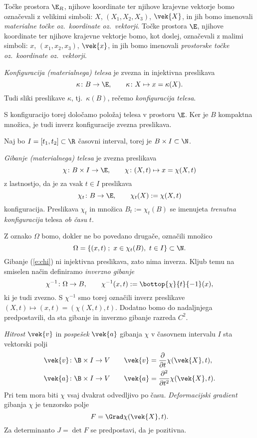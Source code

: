 Točke prostora $\E_R$, njihove koordinate ter njihove krajevne vektorje bomo označevali
z velikimi simboli: $X$, $(X_1,X_2,X_3)$, $\vek{X}$, in jih bomo imenovali
\emph{materialne točke oz.~koordinate oz.~vektorji}.
Točke prostora $\E$, njihove koordinate ter njihove krajevne vektorje bomo,
kot doslej, označevali z malimi simboli: $x$, $(x_1,x_2,x_3)$, $\vek{x}$, in jih bomo imenovali
\emph{prostorske točke oz.~koordinate oz.~vektorji}.

\begin{definicija}
	\emph{Konfiguracija (materialnega) telesa} je zvezna in injektivna preslikava
	\[ \kappa\colon B\to\E,\qquad \kappa\colon X\mapsto x=\kappa(X). \]
	Tudi sliki preslikave $\kappa$, tj.~$\kappa(B)$, rečemo \emph{konfiguracija telesa}.
\end{definicija}
S konfiguracijo torej določamo položaj telesa v prostoru $\E$. Ker je $B$ kompaktna
množica, je tudi inverz konfiguracije zvezna preslikava.

Naj bo $I=[t_1,t_2]\subset\R$ časovni interval, torej je $B\times I\subset\N$.
\begin{definicija}
	\emph{Gibanje (materialnega) telesa} je zvezna preslikava
	\begin{equation}\label{e:chi}
		\chi\colon B\times I\to\E,\qquad \chi\colon(X,t)\mapsto x=\chi(X,t)
	\end{equation}
	z lastnostjo, da je za vsak $t\in I$ preslikava
	\[ \chi_t\colon B\to\E, \qquad \chi_t(X):=\chi(X,t) \]
	konfiguracija. Preslikava $\chi_t$ in množica $ B_t:=\chi_t(B)$ se imenujeta
	\emph{trenutna konfiguracija} telesa \emph{ob času} $t$.
\end{definicija}

Z oznako $\Omega$ bomo, dokler ne bo povedano drugače, označili množico
\[ \Omega=\{(x,t)\;;\ x\in\chi_t(B),\ t\in I\}\subset\N. \]
Gibanje (\ref{e:chi}) ni injektivna preslikava, zato nima inverza. Kljub temu na smiselen
način definiramo \emph{inverzno gibanje}
\[
	\chi^{-1}\colon\Omega\to B,\qquad
	\chi^{-1}(x,t):=\bottop{\chi}{t}{-1}(x),
\]
ki je tudi zvezno. S $\chi^{-1}$ smo torej označili inverz preslikave
$(X,t)\mapsto(x,t)=(\chi(X,t),t)$. Dodatno bomo do nadaljnjega predpostavili, da sta gibanje
in inverzno gibanje razreda $C^2$.

\emph{Hitrost} $\vek{v}$ in \emph{pospešek} $\vek{a}$ gibanja $\chi$ v časovnem intervalu $I$ sta vektorski polji
\begin{align}
	\vek{v}\colon\B\times I\to V \qquad & \vek{v} = \frac{\partial}{\partial t}\chi(\vek{X},t), \label{e:v} \\
	\vek{a}\colon\B\times I\to V \qquad & \vek{a} = \frac{\partial^2}{\partial t^2}\chi(\vek{X},t). \label{e:a}
\end{align}
Pri tem mora biti $\chi$ vsaj dvakrat odvedljivo po času. \emph{Deformacijski gradient} gibanja $\chi$ je
tenzorsko polje
\begin{equation} \label{e:F} F=\Grad\chi(\vek{X},t). \end{equation}
Za determinanto $J=\det F$ se predpostavi, da je pozitivna.


